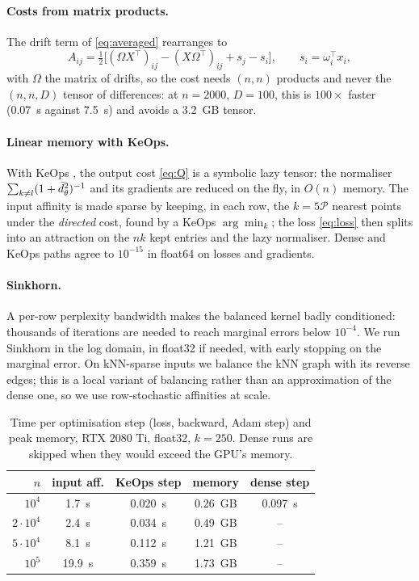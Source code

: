 \paragraph{Costs from matrix products.}
The drift term of \eqref{eq:averaged} rearranges to
\[
  A_{ij}=\tfrac12\big[(\Omega X^\top)_{ij}-(X\Omega^\top)_{ij}+s_j-s_i\big],
  \qquad s_i=\omega_i^\top x_i ,
\]
with $\Omega$ the matrix of drifts, so the cost needs $(n,n)$ products and
never the $(n,n,D)$ tensor of differences: at $n=2000$, $D=100$, this is
$100\times$ faster (0.07~s against 7.5~s) and avoids a 3.2~GB tensor.

\paragraph{Linear memory with KeOps.}
With KeOps \citep{charlier2021keops}, the output cost \eqref{eq:Q} is a
symbolic lazy tensor: the normaliser $\sum_{k\neq l}(1+\bar d_\theta^2)^{-1}$
and its gradients are reduced on the fly, in $O(n)$ memory. The input
affinity is made sparse by keeping, in each row, the $k=5\mathcal{P}$
nearest points under the \emph{directed} cost, found by a KeOps
$\arg\min_k$; the loss \eqref{eq:loss} then splits into an attraction on
the $nk$ kept entries and the lazy normaliser. Dense and KeOps paths agree
to $10^{-15}$ in float64 on losses and gradients.

\paragraph{Sinkhorn.}
A per-row perplexity bandwidth makes the balanced kernel badly
conditioned: thousands of iterations are needed to reach marginal errors
below $10^{-4}$. We run Sinkhorn in the log domain, in float32 if needed,
with early stopping on the marginal error. On kNN-sparse inputs we balance
the kNN graph with its reverse edges; this is a local variant of balancing
rather than an approximation of the dense one, so we use row-stochastic
affinities at scale.

\begin{table}[h]
  \caption{Time per optimisation step (loss, backward, Adam step) and peak
  memory, RTX 2080 Ti, float32, $k=250$. Dense runs are skipped when they
  would exceed the GPU's memory.}
  \label{tab:scaling}
  \centering
  \small
  \setlength{\tabcolsep}{4pt}
  \begin{tabular}{rcccc}
    \toprule
    $n$ & input aff. & KeOps step & memory & dense step \\
    \midrule
    $10^4$ & 1.7~s & 0.020~s & 0.26~GB & 0.097~s \\
    $2\cdot10^4$ & 2.4~s & 0.034~s & 0.49~GB & -- \\
    $5\cdot10^4$ & 8.1~s & 0.112~s & 1.21~GB & -- \\
    $10^5$ & 19.9~s & 0.359~s & 1.73~GB & -- \\
    \bottomrule
  \end{tabular}
\end{table}

